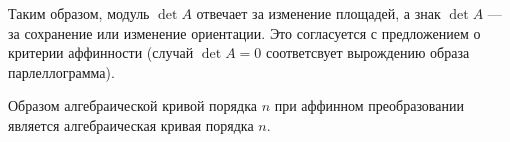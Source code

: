 Таким образом, модуль $\det A$ отвечает за изменение площадей, а 
знак $\det A$ --- за сохранение или изменение ориентации.
Это согласуется с предложением о критерии аффинности (случай $\det A = 0$ соответсвует 
вырождению образа парлеллограмма).



\begin{theor}
Образом алгебраической кривой порядка $n$ при аффинном преобразовании является
алгебраическая кривая порядка $n$.
\end{theor}



